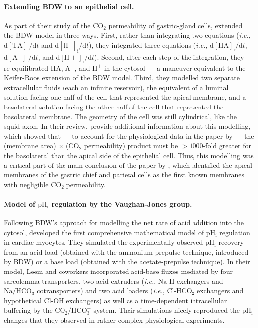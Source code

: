 \documentclass[fleqn,10pt]{physiome}
\begin{document}
\paragraph{Extending BDW to an epithelial cell.}

As part of their study of the $\mathrm{CO_2}$ permeability of gastric-gland cells, \cite{waisbren1994unusual} extended the BDW model in three ways. First, rather than integrating two equations (\emph{i.e.}, $\mathrm{d[TA]_i}/\mathrm{d}t$ and $\mathrm{d[H^+]_i}/\mathrm{d}t$), they integrated three equations (\emph{i.e.}, $\mathrm{d[HA]_i}/\mathrm{d}t$, $\mathrm{d[A^-]_i}/\mathrm{d}t$, and $\mathrm{d[H+]_i}/\mathrm{d}t$). Second, after each step of the integration, they re-equilibrated $\mathrm{HA}$, $\mathrm{A^-}$, and $\mathrm{H^+}$ in the cytosol --- a maneuver equivalent to the Keifer-Roos extension of the BDW model. Third, they modelled two separate extracellular fluids (each an infinite reservoir), the equivalent of a luminal solution facing one half of the cell that represented the apical membrane, and a basolateral solution facing the other half of the cell that represented the basolateral membrane. The geometry of the cell was still cylindrical, like the squid axon. In their review, \cite{boron1994unique} provide additional information about this modelling, which showed that --- to account for the physiological data in the paper by \cite{waisbren1994unusual} --- the (membrane area) $\times$ ($\mathrm{CO_2}$ permeability) product must be $>1000$-fold greater for the basolateral than the apical side of the epithelial cell. Thus, this modelling was a critical part of the main conclusion of the paper by \cite{waisbren1994unusual}, which identified the apical membranes of the gastric chief and parietal cells as the first known membranes with negligible $\mathrm{CO_2}$ permeability.

\paragraph{Model of $\mathrm{pH_i}$ regulation by the Vaughan-Jones group.}

Following BDW's approach for modelling the net rate of acid addition into the cytosol, \cite{leem1999characterization} developed the first comprehensive mathematical model of $\mathrm{pH_i}$ regulation in cardiac myocytes. They simulated the experimentally observed $\mathrm{pH_i}$ recovery from an acid load (obtained with the ammonium prepulse technique, introduced by BDW) or a base load (obtained with the acetate-prepulse technique). In their model, Leem and coworkers incorporated acid-base fluxes mediated by four sarcolemma transporters, two acid extruders (\emph{i.e.}, $\mathrm{Na}$-$\mathrm{H}$ exchangers and $\mathrm{Na}/\mathrm{HCO_3}$ cotransporters) and two acid loaders (\emph{i.e.}, $\mathrm{Cl}$-$\mathrm{HCO_3}$ exchangers and hypothetical $\mathrm{Cl}$-$\mathrm{OH}$ exchangers) as well as a time-dependent intracellular buffering by the $\mathrm{CO_2}/\mathrm{HCO_3^-}$ system. Their simulations nicely reproduced the $\mathrm{pH_i}$ changes that they observed in rather complex physiological experiments.
\end{document}
